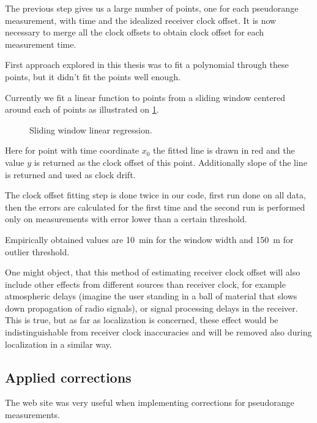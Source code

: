The previous step gives us a large number of points, one for each pseudorange
measurement, with time and the idealized receiver clock offset.
It is now necessary to merge all the clock offsets to obtain clock offset for
each measurement time.

First approach explored in this thesis was to fit a polynomial through these
points, but it didn't fit the points well enough.

Currently we fit a linear function to points from a sliding window centered
around each of points as illustrated on \cref{fig:sliding-window-linear-regression}.

\begin{figure}[h]
	\centering
	
	\caption{Sliding window linear regression.}
	\label{fig:sliding-window-linear-regression}
\end{figure}

Here for point with time coordinate \(x_0\) the fitted line is drawn in red
and the value \(y\) is returned as the clock offset of this point.
Additionally slope of the line is returned and used as clock drift.

The clock offset fitting step is done twice in our code, first run done on
all data, then the errors are calculated for the first time and the second run
is performed only on measurements with error lower than a certain threshold.

Empirically obtained values are \SI{10}{\minute} for the window width and
\SI{150}{\meter} for outlier threshold.

One might object, that this method of estimating receiver clock offset will
also include other effects from different sources than receiver clock,
for example atmospheric delays (imagine the user standing in a ball of material
that slows down propagation of radio signals), or signal processing delays
in the receiver.
This is true, but as far as localization is concerned, these effect would
be indistinguishable from receiver clock inaccuracies and will be
removed also during localization in a similar way.

\subsection{Applied corrections}
The web site \cite{sam-www} was very useful when implementing corrections for
pseudorange measurements.

